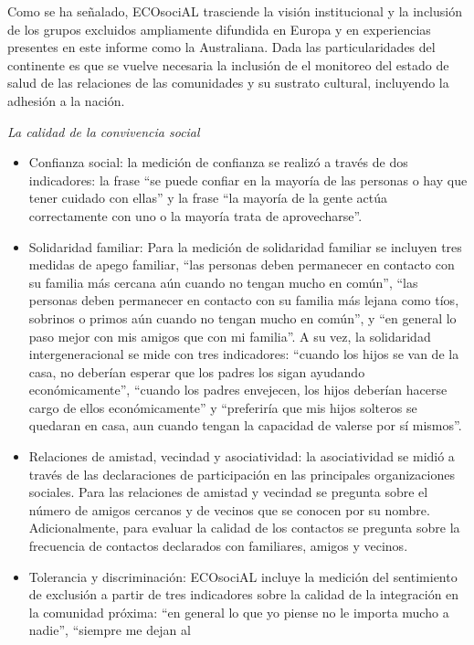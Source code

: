 \documentclass[
  12pt,
]{book}
\begin{document}
Como se ha señalado, ECOsociAL trasciende la visión institucional y la inclusión de los grupos excluidos ampliamente difundida en Europa y en experiencias presentes en este informe como la Australiana. Dada las particularidades del continente es que se vuelve necesaria la inclusión de el monitoreo del estado de salud de las relaciones de las comunidades y su sustrato cultural, incluyendo la adhesión a la nación.

\emph{La calidad de la convivencia social}

\begin{itemize}
\item
  Confianza social: la medición de confianza se realizó a través de
  dos indicadores: la frase ``se puede confiar en la mayoría de las
  personas o hay que tener cuidado con ellas'' y la frase ``la mayoría
  de la gente actúa correctamente con uno o la mayoría trata de
  aprovecharse''.
\item
  Solidaridad familiar: Para la medición de solidaridad familiar se
  incluyen tres medidas de apego familiar, ``las personas deben
  permanecer en contacto con su familia más cercana aún cuando no
  tengan mucho en común'', ``las personas deben permanecer en contacto
  con su familia más lejana como tíos, sobrinos o primos aún cuando no
  tengan mucho en común'', y ``en general lo paso mejor con mis amigos
  que con mi familia''. A su vez, la solidaridad intergeneracional se
  mide con tres indicadores: ``cuando los hijos se van de la casa, no
  deberían esperar que los padres los sigan ayudando económicamente'',
  ``cuando los padres envejecen, los hijos deberían hacerse cargo de
  ellos económicamente'' y ``preferiría que mis hijos solteros se
  quedaran en casa, aun cuando tengan la capacidad de valerse por sí
  mismos''.
\item
  Relaciones de amistad, vecindad y asociatividad: la asociatividad se
  midió a través de las declaraciones de participación en las
  principales organizaciones sociales. Para las relaciones de amistad
  y vecindad se pregunta sobre el número de amigos cercanos y de
  vecinos que se conocen por su nombre. Adicionalmente, para evaluar
  la calidad de los contactos se pregunta sobre la frecuencia de
  contactos declarados con familiares, amigos y vecinos.
\item
  Tolerancia y discriminación: ECOsociAL incluye la medición del
  sentimiento de exclusión a partir de tres indicadores sobre la
  calidad de la integración en la comunidad próxima: ``en general lo
  que yo piense no le importa mucho a nadie'', ``siempre me dejan al

\end{itemize}
\end{document}
